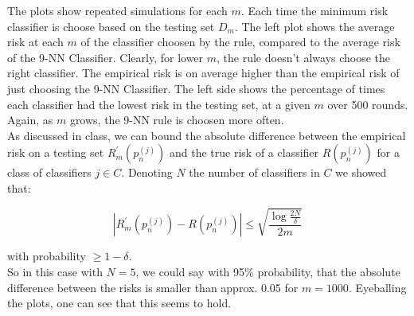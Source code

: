 \documentclass[a4paper, 11pt]{article} %
\begin{document}
The plots show repeated simulations for each $m$. Each time the minimum risk classifier is choose based on the testing set $D_m$. The left plot shows the average risk at each $m$ of the classifier choosen by the rule, compared to the average risk of the 9-NN Classifier. Clearly, for lower $m$, the rule doesn't always choose the right classifier. The empirical risk is on average higher than the empirical risk of just choosing the 9-NN Classifier. The left side shows the percentage of times each classifier had the lowest risk in the testing set, at a given $m$ over 500 rounds. Again, as $m$ grows, the 9-NN rule is choosen more often. \\

As discussed in class, we can bound the absolute difference between the empirical risk on a testing set $R _ { m } ^ { \prime } \left( p _ { n } ^ { ( j ) } \right)$ and the true risk of a classifier $R \left( p _ { n } ^ { ( j ) } \right)$ for a class of classifiers $j \in C$. Denoting $N$ the number of classifiers in $C$ we showed that:

$$\left| R _ { m } ^ { \prime } \left( p _ { n } ^ { ( j ) } \right) - R \left( p _ { n } ^ { ( j ) } \right) \right| \leqslant \sqrt { \frac { \log \frac { 2 N } { \delta } } { 2 m } }$$

with probability $\geq 1 - \delta$.\\

So in this case with $N=5$, we could say with 95\% probability, that the absolute difference between the risks is smaller than approx. 0.05 for $m=1000$. Eyeballing the plots, one can see that this seems to hold. 
\end{document}
